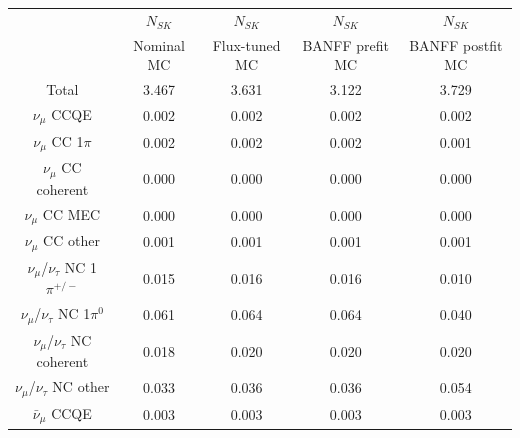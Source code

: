 \begin{table}
\begin{tabular} { | c ||c | c | c | c |  | }
\hline
                                                  & $N_{SK}$            & $N_{SK}$            & $N_{SK}$            & $N_{SK}$             \\ 
                                                  & Nominal MC          & Flux-tuned MC       & BANFF prefit MC     & BANFF postfit MC     \\ \hline 
Total                                             & 3.467               & 3.631               & 3.122               & 3.729                \\ \hline 
\hline 
$\nu_\mu$ CCQE                                    & 0.002               & 0.002               & 0.002               & 0.002                \\ \hline 
$\nu_\mu$ CC 1$\pi$                               & 0.002               & 0.002               & 0.002               & 0.001                \\ \hline 
$\nu_\mu$ CC coherent                             & 0.000               & 0.000               & 0.000               & 0.000                \\ \hline 
$\nu_\mu$ CC MEC                                  & 0.000               & 0.000               & 0.000               & 0.000                \\ \hline 
$\nu_\mu$ CC other                                & 0.001               & 0.001               & 0.001               & 0.001                \\ \hline 
$\nu_\mu$/$\nu_\tau$ NC 1$\pi^{+/-}$              & 0.015               & 0.016               & 0.016               & 0.010                \\ \hline 
$\nu_\mu$/$\nu_\tau$ NC 1$\pi^0$                  & 0.061               & 0.064               & 0.064               & 0.040                \\ \hline 
$\nu_\mu$/$\nu_\tau$ NC coherent                  & 0.018               & 0.020               & 0.020               & 0.020                \\ \hline 
$\nu_\mu$/$\nu_\tau$ NC other                     & 0.033               & 0.036               & 0.036               & 0.054                \\ \hline 
$\bar{\nu}_\mu$ CCQE                              & 0.003               & 0.003               & 0.003               & 0.003                \\ \hline 

\end{tabular}
\end{table}
